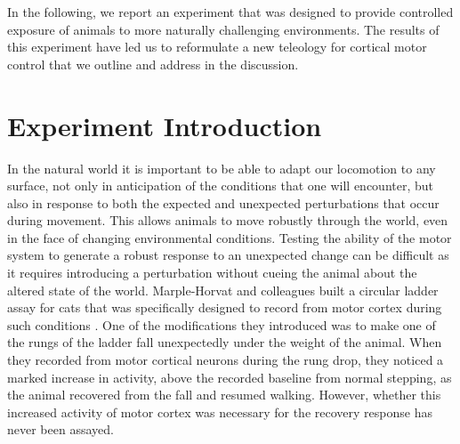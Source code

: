 In the following, we report an experiment that was designed to provide controlled exposure of animals to more naturally challenging environments. The results of this experiment have led us to reformulate a new teleology for cortical motor control that we outline and address in the discussion.

\section{Experiment Introduction}

In the natural world it is important to be able to adapt our locomotion to any surface, not only in anticipation of the conditions that one will encounter, but also in response to both the expected and unexpected perturbations that occur during movement. This allows animals to move robustly through the world, even in the face of changing environmental conditions. Testing the ability of the motor system to generate a robust response to an unexpected change can be difficult as it requires introducing a perturbation without cueing the animal about the altered state of the world. Marple-Horvat and colleagues built a circular ladder assay for cats that was specifically designed to record from motor cortex during such conditions \cite{Marple-Horvat1993}. One of the modifications they introduced was to make one of the rungs of the ladder fall unexpectedly under the weight of the animal. When they recorded from motor cortical neurons during the rung drop, they noticed a marked increase in activity, above the recorded baseline from normal stepping, as the animal recovered from the fall and resumed walking. However, whether this increased activity of motor cortex was necessary for the recovery response has never been assayed.
